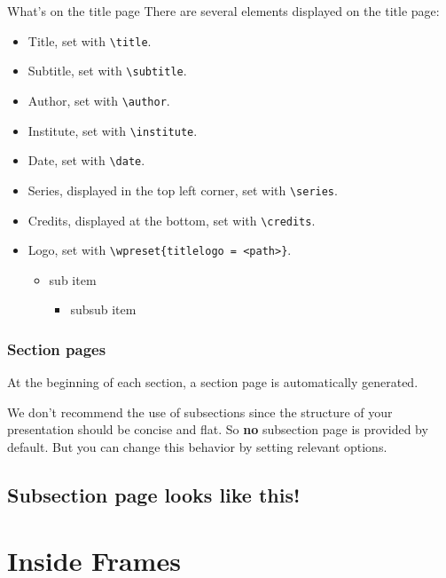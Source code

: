 \documentclass[no-math, aspectratio=1610, 10pt]{beamer}
\begin{document}
    \begin{frame}[fragile]{What's on the title page}
        There are several elements displayed on the title page:
        \begin{itemize}
            \item Title, set with \verb|\title|.
            \item Subtitle, set with \verb|\subtitle|.
            \item Author, set with \verb|\author|.
            \item Institute, set with \verb|\institute|.
            \item Date, set with \verb|\date|.
            \item Series, displayed in the top left corner, set with \verb|\series|.
            \item Credits, displayed at the bottom, set with \verb|\credits|.
            \item Logo, set with \verb|\wpreset{titlelogo = <path>}|.
            \begin{itemize}
                \item sub item
                \begin{itemize}
                    \item subsub item
                \end{itemize}
            \end{itemize}
        \end{itemize}
    \end{frame}

    \begin{frame}
        \frametitle{Section pages}
        At the beginning of each section, a section page is automatically generated. 

        \hrulefill
        
        We don't recommend the use of subsections since the structure of your presentation should be concise and flat. So \textbf{no} subsection page is provided by default. But you can change this behavior by setting relevant options.
    \end{frame}

    \subsection{Subsection page looks like this!}

    \section{Inside Frames}
\end{document}
